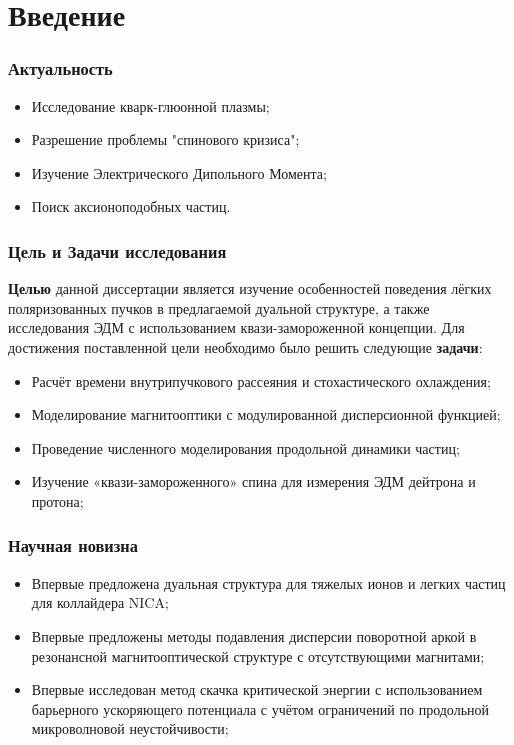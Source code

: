 \section{Введение}
\begin{frame}
 \frametitle{Актуальность}
 	\begin{itemize}
 		\item Исследование кварк-глюонной плазмы;
 		\item Разрешение проблемы "спинового кризиса";
 		\item Изучение Электрического Дипольного Момента;
 		\item Поиск аксионоподобных частиц.
 	\end{itemize}


\end{frame}
\begin{frame}
	\frametitle{Цель и Задачи исследования}
	\textbf{Целью} данной диссертации является изучение особенностей поведения лёгких поляризованных пучков в предлагаемой дуальной структуре, а также исследования ЭДМ с использованием квази-замороженной концепции.\newline \newline
	Для достижения поставленной цели необходимо было решить следующие \textbf{задачи}:
	\begin{itemize}
		\item Расчёт времени внутрипучкового рассеяния и стохастического охлаждения;
		\item Моделирование магнитооптики с модулированной дисперсионной функцией;
		\item Проведение численного моделирования продольной динамики частиц;
		\item Изучение «квази-замороженного» спина для измерения ЭДМ дейтрона и протона;
	\end{itemize}
\end{frame}
\begin{frame}
	\frametitle{Научная новизна}
	\begin{itemize}
		\item	Впервые предложена дуальная структура для тяжелых ионов и легких частиц для коллайдера NICA;
		\vspace{1em}
		\item 	Впервые предложены методы подавления дисперсии поворотной аркой в резонансной магнитооптической структуре с отсутствующими магнитами;
		\vspace{1em}
		\item	Впервые исследован метод скачка критической энергии с использованием барьерного ускоряющего потенциала с учётом ограничений по продольной микроволновой неустойчивости;
	\end{itemize}
	
\end{frame}
